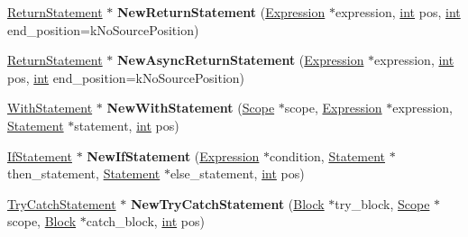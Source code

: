 \begin{DoxyCompactItemize}
\item 
\mbox{\label{classv8_1_1internal_1_1AstNodeFactory_a81e9af35a1704e77051386f685acd526}} 
\mbox{\hyperlink{classv8_1_1internal_1_1ReturnStatement}{Return\+Statement}} $\ast$ {\bfseries New\+Return\+Statement} (\mbox{\hyperlink{classv8_1_1internal_1_1Expression}{Expression}} $\ast$expression, \mbox{\hyperlink{classint}{int}} pos, \mbox{\hyperlink{classint}{int}} end\+\_\+position=k\+No\+Source\+Position)
\item 
\mbox{\label{classv8_1_1internal_1_1AstNodeFactory_a14c8e0e6031bcc508bfaab0991dc5d43}} 
\mbox{\hyperlink{classv8_1_1internal_1_1ReturnStatement}{Return\+Statement}} $\ast$ {\bfseries New\+Async\+Return\+Statement} (\mbox{\hyperlink{classv8_1_1internal_1_1Expression}{Expression}} $\ast$expression, \mbox{\hyperlink{classint}{int}} pos, \mbox{\hyperlink{classint}{int}} end\+\_\+position=k\+No\+Source\+Position)
\item 
\mbox{\label{classv8_1_1internal_1_1AstNodeFactory_aa541d282f467b721c331945d96f30fbc}} 
\mbox{\hyperlink{classv8_1_1internal_1_1WithStatement}{With\+Statement}} $\ast$ {\bfseries New\+With\+Statement} (\mbox{\hyperlink{classv8_1_1internal_1_1Scope}{Scope}} $\ast$scope, \mbox{\hyperlink{classv8_1_1internal_1_1Expression}{Expression}} $\ast$expression, \mbox{\hyperlink{classv8_1_1internal_1_1Statement}{Statement}} $\ast$statement, \mbox{\hyperlink{classint}{int}} pos)
\item 
\mbox{\label{classv8_1_1internal_1_1AstNodeFactory_af0f8c36bc5998de155ba435e2748c2c8}} 
\mbox{\hyperlink{classv8_1_1internal_1_1IfStatement}{If\+Statement}} $\ast$ {\bfseries New\+If\+Statement} (\mbox{\hyperlink{classv8_1_1internal_1_1Expression}{Expression}} $\ast$condition, \mbox{\hyperlink{classv8_1_1internal_1_1Statement}{Statement}} $\ast$then\+\_\+statement, \mbox{\hyperlink{classv8_1_1internal_1_1Statement}{Statement}} $\ast$else\+\_\+statement, \mbox{\hyperlink{classint}{int}} pos)
\item 
\mbox{\label{classv8_1_1internal_1_1AstNodeFactory_a5b40d75f254c6959adbe1b0a033c6b6c}} 
\mbox{\hyperlink{classv8_1_1internal_1_1TryCatchStatement}{Try\+Catch\+Statement}} $\ast$ {\bfseries New\+Try\+Catch\+Statement} (\mbox{\hyperlink{classv8_1_1internal_1_1Block}{Block}} $\ast$try\+\_\+block, \mbox{\hyperlink{classv8_1_1internal_1_1Scope}{Scope}} $\ast$scope, \mbox{\hyperlink{classv8_1_1internal_1_1Block}{Block}} $\ast$catch\+\_\+block, \mbox{\hyperlink{classint}{int}} pos)

\end{DoxyCompactItemize}
